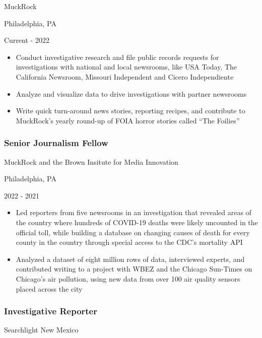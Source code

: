 \documentclass[
]{article}
\providecommand{\tightlist}{%
  \setlength{\itemsep}{0pt}\setlength{\parskip}{0pt}}
\begin{document}
MuckRock

Philadelphia, PA

Current - 2022

\begin{itemize}
\tightlist
\item
  Conduct investigative research and file public records requests for
  investigations with national and local newsrooms, like USA Today, The
  California Newsroom, Missouri Independent and Cicero Independiente
\item
  Analyze and visualize data to drive investigations with partner
  newsrooms
\item
  Write quick turn-around news stories, reporting recipes, and
  contribute to MuckRock's yearly round-up of FOIA horror stories called
  ``The Foilies''
\end{itemize}

\hypertarget{senior-journalism-fellow}{%
\subsubsection{Senior Journalism
Fellow}\label{senior-journalism-fellow}}

MuckRock and the Brown Insitute for Media Innovation

Philadelphia, PA

2022 - 2021

\begin{itemize}
\tightlist
\item
  Led reporters from five newsrooms in an investigation that revealed
  areas of the country where hundreds of COVID-19 deaths were likely
  uncounted in the official toll, while building a database on changing
  causes of death for every county in the country through special access
  to the CDC's mortality API
\item
  Analyzed a dataset of eight million rows of data, interviewed experts,
  and contributed writing to a project with WBEZ and the Chicago
  Sun-Times on Chicago's air pollution, using new data from over 100 air
  quality sensors placed across the city
\end{itemize}

\hypertarget{investigative-reporter}{%
\subsubsection{Investigative Reporter}\label{investigative-reporter}}

Searchlight New Mexico
\end{document}
